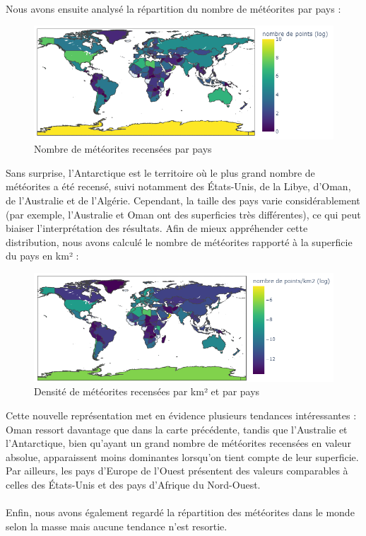 \documentclass[12pt]{article}
\begin{document}
\\
Nous avons ensuite analysé la répartition du nombre de météorites par pays :
\begin{figure}[H]
 \centering 
\includegraphics[width=17cm]{Images/exploration/map_points_countries_avec_echelle.png}
 \caption{Nombre de météorites recensées par pays}
 \end{figure}
Sans surprise, l’Antarctique est le territoire où le plus grand nombre de météorites a été recensé, suivi notamment des États-Unis, de la Libye, d’Oman, de l’Australie et de l’Algérie. Cependant, la taille des pays varie considérablement (par exemple, l’Australie et Oman ont des superficies très différentes), ce qui peut biaiser l’interprétation des résultats. Afin de mieux appréhender cette distribution, nous avons calculé le nombre de météorites rapporté à la superficie du pays en km² :
\begin{figure}[H] 
\centering
 \includegraphics[width=17cm]{Images/exploration/map_points_km2_avec_echelle.png}
 \caption{Densité de météorites recensées par km² et par pays}
 \end{figure}
Cette nouvelle représentation met en évidence plusieurs tendances intéressantes : Oman ressort davantage que dans la carte précédente, tandis que l’Australie et l’Antarctique, bien qu’ayant un grand nombre de météorites recensées en valeur absolue, apparaissent moins dominantes lorsqu’on tient compte de leur superficie. Par ailleurs, les pays d’Europe de l’Ouest présentent des valeurs comparables à celles des États-Unis et des pays d’Afrique du Nord-Ouest.\\
\\
Enfin, nous avons également regardé la répartition des météorites dans le monde selon la masse mais aucune tendance n'est resortie.
\end{document}
